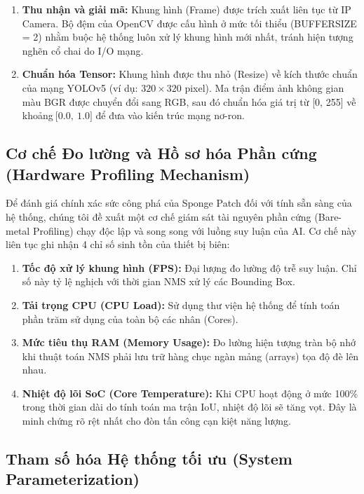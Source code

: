 \documentclass[a4paper,fleqn]{cas-dc}
\begin{document}
\begin{enumerate}
\def\labelenumi{\arabic{enumi}.}
\item
  \textbf{Thu nhận và giải mã:} Khung hình (Frame) được trích xuất liên
  tục từ IP Camera. Bộ đệm của OpenCV được cấu hình ở mức tối thiểu
  (BUFFERSIZE = 2) nhằm buộc hệ thống luôn xử lý khung hình mới nhất,
  tránh hiện tượng nghẽn cổ chai do I/O mạng.
\item
  \textbf{Chuẩn hóa Tensor:} Khung hình được thu nhỏ (Resize) về kích
  thước chuẩn của mạng YOLOv5 (ví dụ: \(320 \times 320\) pixel). Ma trận
  điểm ảnh không gian màu BGR được chuyển đổi sang RGB, sau đó chuẩn hóa
  giá trị từ {[}0, 255{]} về khoảng\(\ \lbrack 0.0,\ 1.0\rbrack\) để đưa
  vào kiến trúc mạng nơ-ron.
\end{enumerate}

\subsection{Cơ chế Đo lường và Hồ sơ hóa Phần cứng (Hardware Profiling Mechanism)}



Để đánh giá chính xác sức công phá của Sponge Patch đối với tính sẵn
sàng của hệ thống, chúng tôi đề xuất một cơ chế giám sát tài nguyên phần
cứng (Bare-metal Profiling) chạy độc lập và song song với luồng suy luận
của AI. Cơ chế này liên tục ghi nhận 4 chỉ số sinh tồn của thiết bị
biên:

\begin{enumerate}
\def\labelenumi{\arabic{enumi}.}
\item
  \textbf{Tốc độ xử lý khung hình (FPS):} Đại lượng đo lường độ trễ suy
  luận. Chỉ số này tỷ lệ nghịch với thời gian NMS xử lý các Bounding
  Box.
\item
  \textbf{Tải trọng CPU (CPU Load):} Sử dụng thư viện hệ thống để tính
  toán phần trăm sử dụng của toàn bộ các nhân (Cores).
\item
  \textbf{Mức tiêu thụ RAM (Memory Usage):} Đo lường hiện tượng tràn bộ
  nhớ khi thuật toán NMS phải lưu trữ hàng chục ngàn mảng (arrays) tọa
  độ đè lên nhau.
\item
  \textbf{Nhiệt độ lõi SoC (Core Temperature):} Khi CPU hoạt động ở mức
  100\% trong thời gian dài do tính toán ma trận IoU, nhiệt độ lõi sẽ
  tăng vọt. Đây là minh chứng rõ rệt nhất cho đòn tấn công cạn kiệt năng
  lượng.
\end{enumerate}

\subsection{Tham số hóa Hệ thống tối ưu (System Parameterization)}
\end{document}
